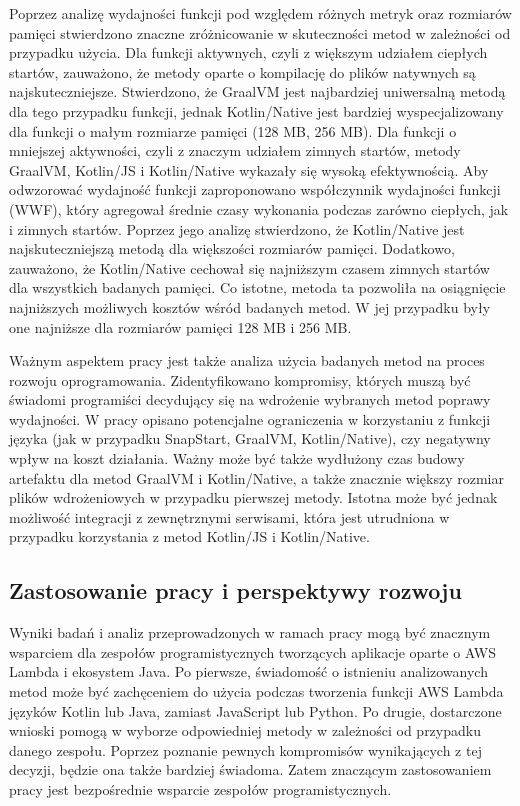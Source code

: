 Poprzez analizę wydajności funkcji pod względem różnych metryk oraz rozmiarów pamięci stwierdzono znaczne zróżnicowanie w skuteczności metod w zależności od przypadku użycia.
Dla funkcji aktywnych, czyli z większym udziałem ciepłych startów, zauważono, że metody oparte o kompilację do plików natywnych są najskuteczniejsze.
Stwierdzono, że GraalVM jest najbardziej uniwersalną metodą dla tego przypadku funkcji, jednak Kotlin/Native jest bardziej wyspecjalizowany dla funkcji o małym rozmiarze pamięci (128 MB, 256 MB).
Dla funkcji o mniejszej aktywności, czyli z znaczym udziałem zimnych startów, metody GraalVM, Kotlin/JS i Kotlin/Native wykazały się wysoką efektywnością.
Aby odwzorować wydajność funkcji zaproponowano współczynnik wydajności funkcji (WWF), który agregował średnie czasy wykonania podczas zarówno ciepłych, jak i zimnych startów.
Poprzez jego analizę stwierdzono, że Kotlin/Native jest najskuteczniejszą metodą dla większości rozmiarów pamięci.
Dodatkowo, zauważono, że Kotlin/Native cechował się najniższym czasem zimnych startów dla wszystkich badanych pamięci.
Co istotne, metoda ta pozwoliła na osiągnięcie najniższych możliwych kosztów wśród badanych metod.
W jej przypadku były one najniższe dla rozmiarów pamięci 128 MB i 256 MB.

Ważnym aspektem pracy jest także analiza użycia badanych metod na proces rozwoju oprogramowania.
Zidentyfikowano kompromisy, których muszą być świadomi programiści decydujący się na wdrożenie wybranych metod poprawy wydajności.
W pracy opisano potencjalne ograniczenia w korzystaniu z funkcji języka (jak w przypadku SnapStart, GraalVM, Kotlin/Native), czy negatywny wpływ na koszt działania.
Ważny może być także wydłużony czas budowy artefaktu dla metod GraalVM i Kotlin/Native, a także znacznie większy rozmiar plików wdrożeniowych w przypadku pierwszej metody.
Istotna może być jednak możliwość integracji z zewnętrznymi serwisami, która jest utrudniona w przypadku korzystania z metod Kotlin/JS i Kotlin/Native.

\subsection*{Zastosowanie pracy i perspektywy rozwoju}

Wyniki badań i analiz przeprowadzonych w ramach pracy mogą być znacznym wsparciem dla zespołów programistycznych tworzących aplikacje oparte o AWS Lambda i ekosystem Java.
Po pierwsze, świadomość o istnieniu analizowanych metod może być zachęceniem do użycia podczas tworzenia funkcji AWS Lambda języków Kotlin lub Java, zamiast JavaScript lub Python.
Po drugie, dostarczone wnioski pomogą w wyborze odpowiedniej metody w zależności od przypadku danego zespołu.
Poprzez poznanie pewnych kompromisów wynikających z tej decyzji, będzie ona także bardziej świadoma.
Zatem znaczącym zastosowaniem pracy jest bezpośrednie wsparcie zespołów programistycznych.

